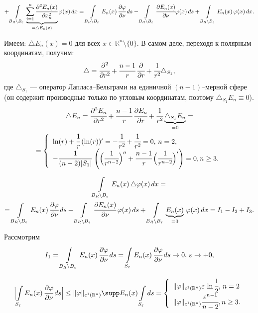 \documentclass[12pt,a4paper,draft]{article}
\DeclareRobustCommand*{\т}{~--- }
\DeclareRobustCommand*{\ч}{~-- }
\begin{document}
$$+\int\limits_{B_R\setminus
B_{\varepsilon}}\underbrace{\sum_{i=1}^n\cfrac{\partial^2
E_n(x)}{\partial x_n^2}}_{=\triangle E_n(x)}\varphi(x)\,dx=
\int\limits_{B_R\setminus B_{\varepsilon}}E_n(x)\, \cfrac{\partial
\varphi}{\partial \nu}\,ds- \int\limits_{B_R\setminus
B_{\varepsilon}}\cfrac{\partial E_n(x)}{\partial
\nu}\varphi(x)\,ds+ \int\limits_{B_R\setminus
B_{\varepsilon}}E_n(x)\,\varphi(x)\,dx.$$

Имеем: $\triangle E_n(x)=0$ для всех $x\in \mathbb
R^n\setminus\{0\}.$ В самом деле, переходя к полярным координатам,
получим:
$$\triangle=\cfrac{\partial^2}{\partial
r^2}+\cfrac{n-1}r\,\cfrac{\partial}{\partial r}+
\cfrac1{r^2}\triangle_{S_1},$$ где $\triangle_{S_1}$ --- оператор
Лапласа--Бельтрами на единичной $(n-1)$--мерной сфере (он содержит
производные только по угловым координатам, поэтому
$\triangle_{S_1}E_n\equiv0$).
\begin{multline}
\triangle E_n=\cfrac{\partial^2 E_n}{\partial
r^2}+\cfrac{n-1}r\,\cfrac{\partial E_n}{\partial r}+
\cfrac1{r^2}\underbrace{\triangle_{S_1}E_n}_{=0}=\\=
\left\{%
\begin{array}{ll}
    \ln(r)+\cfrac1r\,( \ln(r))'=-\cfrac1{r^2}+\cfrac1{r^2}=0,\,n=2, \\
    -\cfrac1{(n-2)|S_1|}\,\left( \Bigl(\cfrac1{r^{n-2}}\Bigr)''+\cfrac{n-1}r\,\Bigl(\cfrac1{r^{n-2}}\Bigr)'\right)=0, n\ge3.\\
\end{array}%
\right.
\end{multline}


\begin{multline}
\int\limits_{B_R\setminus
B_{\varepsilon}}E_n(x)\,\triangle \varphi(x)\,dx=\\=
\int\limits_{B_R\setminus B_{\varepsilon}}E_n(x)\, \cfrac{\partial
\varphi}{\partial \nu}\,ds- \int\limits_{B_R\setminus
B_{\varepsilon}}\cfrac{\partial E_n(x)}{\partial
\nu}\,\varphi(x)\,ds+\int\limits_{B_R\setminus
B_{\varepsilon}}\underbrace{E_n(x)}_{=0}\,\varphi(x)\,dx=I_1-I_2+I_3.
\end{multline}

Рассмотрим $$I_1=\int\limits_{B_R\setminus
B_{\varepsilon}}E_n(x)\, \cfrac{\partial \varphi}{\partial
\nu}\,ds= \int\limits_{S_\varepsilon}E_n(x)\, \cfrac{\partial
\varphi}{\partial \nu}\,ds\to0,\,\varepsilon\to+0,$$

$$\Bigl|\int\limits_{S_\varepsilon}E_n(x)\, \cfrac{\partial
\varphi}{\partial \nu}\,ds\Bigr|\le \|\varphi\|_{c^1(\mathbb
R^n)}\supp E_n(x)\int\limits_{S_\varepsilon}ds=
\left\{%
\begin{array}{ll}
    \|\varphi\|_{c^1(\mathbb
R^n)}\varepsilon\,\ln\cfrac12,\,n=2  \\
    \|\varphi\|_{c^1(\mathbb
R^n)}\cfrac{\varepsilon^{n-1}}{n-2}, n\ge3. \\
\end{array}%
\right.    $$
\end{document}
